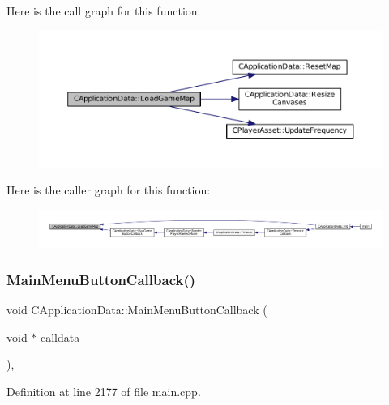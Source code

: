 Here is the call graph for this function\+:\nopagebreak
\begin{figure}[H]
\begin{center}
\leavevmode
\includegraphics[width=350pt]{classCApplicationData_a89af0c7917be766575720e5ac79c8d2d_cgraph}
\end{center}
\end{figure}
Here is the caller graph for this function\+:\nopagebreak
\begin{figure}[H]
\begin{center}
\leavevmode
\includegraphics[width=350pt]{classCApplicationData_a89af0c7917be766575720e5ac79c8d2d_icgraph}
\end{center}
\end{figure}
\hypertarget{classCApplicationData_a4410839118b5b74dab798ad7be6f703b}{}\label{classCApplicationData_a4410839118b5b74dab798ad7be6f703b} 
\subsubsection{\texorpdfstring{Main\+Menu\+Button\+Callback()}{MainMenuButtonCallback()}}
{\footnotesize\ttfamily void C\+Application\+Data\+::\+Main\+Menu\+Button\+Callback (\begin{DoxyParamCaption}\item[{void $\ast$}]{calldata }\end{DoxyParamCaption})\hspace{0.3cm}{\ttfamily [static]}, {\ttfamily [protected]}}



Definition at line 2177 of file main.\+cpp.



